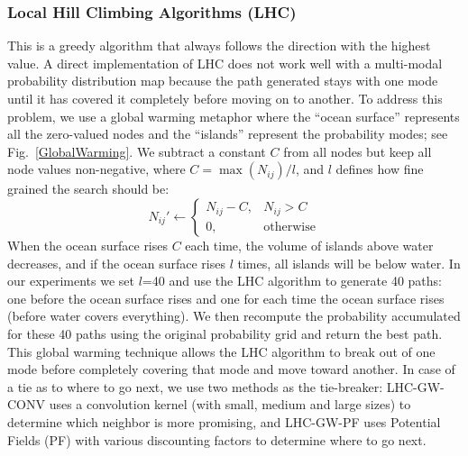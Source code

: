 %

\subsubsection{Local Hill Climbing Algorithms (LHC)}

This is a greedy algorithm that always follows the direction with the highest value. A direct implementation of LHC does not work well with a multi-modal probability distribution map because the path generated stays with one mode until it has covered it completely before moving on to another. To address this problem, we use a global warming metaphor where the ``ocean surface'' represents all the zero-valued nodes and the ``islands'' represent the probability modes; see Fig.~\ref{GlobalWarming}. We subtract a constant $C$ from all nodes but keep all node values non-negative, where $C \!{=} \max{(N_{ij})}/l$, and $l$ defines how fine grained the search should be:
\begin{equation}
N_{ij}' \leftarrow
	\left\{
	\begin{array}{ll}
		N_{ij} - C, & N_{ij} > C \\
		0, & \mbox{otherwise}
	\end{array}
	\right.
\label{4GW}
\end{equation}
When the ocean surface rises $C$ each time, the volume of islands above water decreases, and if the ocean surface rises $l$ times, all islands will be below water. In our experiments we set $l$=40 and use the LHC algorithm to generate 40 paths: one before the ocean surface rises and one for each time the ocean surface rises (before water covers everything). We then recompute the probability accumulated for these 40 paths using the original probability grid and return the best path. This global warming technique allows the LHC algorithm to break out of one mode before completely covering that mode and move toward another. In case of a tie as to where to go next, we use two methods as the tie-breaker: LHC-GW-CONV uses a convolution kernel (with small, medium and large sizes) to determine which neighbor is more promising, and LHC-GW-PF uses Potential Fields (PF) with various discounting factors to determine where to go next.

